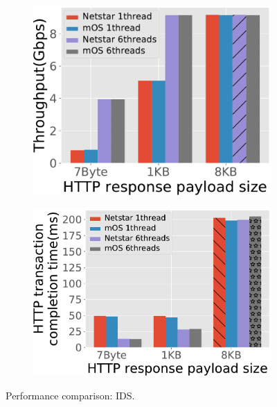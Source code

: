 \begin{figure}[!h]
  \begin{subfigure}[t]{0.45\linewidth}
    \centering
    \includegraphics[width=\columnwidth]{chap-netstar/figure_src/IDS_throughput.pdf}
    \caption{}\label{fig:eval5.1}
  \end{subfigure}\hfill
  \begin{subfigure}[t]{0.53\linewidth}
    \centering
    \includegraphics[width=\columnwidth]{chap-netstar/figure_src/IDS_RTT.pdf}
    \caption{}\label{fig:eval5.2}
  \end{subfigure}
\caption{Performance comparison: IDS.} %
\label{fig:eval5}
\end{figure}

